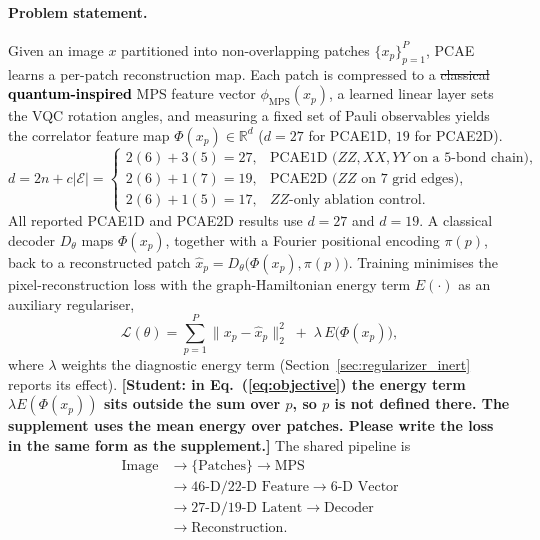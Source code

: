 \documentclass[pdflatex,sn-basic]{sn-jnl}
\newcommand{\del}[1]{\sout{#1}}
\newcommand{\add}[1]{\textbf{\textcolor{black}{#1}}}
\begin{document}
\paragraph{Problem statement.}
Given an image $x$ partitioned into non-overlapping patches
$\{x_p\}_{p=1}^{P}$, PCAE learns a per-patch reconstruction map. Each patch is
compressed to a \del{classical} \add{quantum-inspired} MPS feature vector $\phi_{\mathrm{MPS}}(x_p)$, a learned
linear layer sets the VQC rotation angles, and measuring a fixed set of Pauli
observables yields the correlator feature map
$\Phi(x_p)\in\mathbb{R}^{d}$ ($d=27$ for PCAE1D, $19$ for PCAE2D). 
{\color{red}%
\begin{equation}
  \label{eq:obs_dim}
  d=2n+c\lvert\mathcal{E}\rvert=
  \begin{cases}
    2(6)+3(5)=27, & \text{PCAE1D ($ZZ,XX,YY$ on a 5-bond chain)},\\
    2(6)+1(7)=19, & \text{PCAE2D ($ZZ$ on 7 grid edges)},\\
    2(6)+1(5)=17, & \text{$ZZ$-only ablation control}.
  \end{cases}
\end{equation}
All reported PCAE1D and PCAE2D results use $d=27$ and $d=19$.}
A classical
decoder $D_\theta$ maps $\Phi(x_p)$, together with a Fourier positional encoding
$\pi(p)$, back to a reconstructed patch $\hat{x}_p=D_\theta\!\big(\Phi(x_p),\pi(p)\big)$.
Training minimises the pixel-reconstruction loss with the graph-Hamiltonian energy
term $E(\cdot)$ as an auxiliary regulariser,
\begin{equation}
  \label{eq:objective}
  \mathcal{L}(\theta)=\sum_{p=1}^{P}\big\|x_p-\hat{x}_p\big\|_2^{2}
  \;+\;\lambda\,E\big(\Phi(x_p)\big),
\end{equation}
where $\lambda$ weights the diagnostic energy term (Section~\ref{sec:regularizer_inert}
reports its effect). {\color{red}\textbf{[Student: in Eq.~(\ref{eq:objective})
the energy term $\lambda E(\Phi(x_p))$ sits outside the sum over $p$, so $p$ is
not defined there. The supplement uses the mean energy over patches. Please
write the loss in the same form as the supplement.]}} The shared pipeline is
\begin{equation}
\begin{aligned}
\text{Image}
  &\rightarrow \{\text{Patches}\} \rightarrow \text{MPS}\\
  &\rightarrow \text{46-D/22-D Feature} \rightarrow \text{6-D Vector}\\
  &\rightarrow \text{27-D/19-D Latent} \rightarrow \text{Decoder}\\
  &\rightarrow \text{Reconstruction}.
\end{aligned}
\end{equation}
\end{document}
